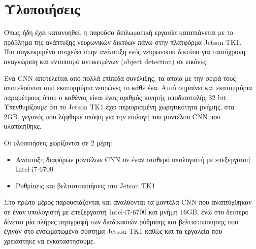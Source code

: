 \chapter{Υλοποιήσεις}
\label{chapter:implementations}

Όπως ήδη έχει κατανοηθεί, η παρούσα διπλωματική εργασία καταπιάνεται με το
πρόβλημα της ανάπτυξης νευρωνικών δικτύων πάνω στην πλατφόρμα Jetson TK1.
Πιο συγκεκριμένα στοχεύει στην ανάπτυξη ενός νευρωνικού δικτύου για ταυτόχρονη
αναγνώριση και εντοπισμό αντικειμένων (object detection) σε εικόνες.

Ένα CNN αποτελείται από πολλά επίπεδα συνέλιξης, τα οποία με την σειρά τους
αποτελούνται από εκατομμύρια νευρώνες το κάθε ένα. Αυτό σημαίνει και εκατομμύρια
παραμέτρους όπου ο καθένας είναι ένας αριθμός κινητής υποδιαστολής 32 bit.
Υπενθυμίζουμε ότι το Jetson TK1 έχει περιορισμένη χωρητικότητα μνήμης, στα 2GB,
γεγονός που λήφθηκε υπόψη για την επιλογή του μοντέλου CNN που υλοποιήθηκε.

Οι υλοποιήσεις χωρίζονται σε 2 μέρη:
\begin{itemize}
  \item{Ανάπτυξη διαφόρων μοντέλων CNN σε έναν σταθερό υπολογιστή με επεξεργαστή Intel-i7-6700}
  \item{Ρυθμίσεις και βελτιστοποιήσεις στο Jetson TK1}
\end{itemize}

Στο πρώτο μέρος παρουσιάζονται και αναλύονται τα μοντέλα CNN που αναπτύχθηκαν
σε έναν υπολογιστή με επεξεργαστή Intel-i7-6700 και μνήμη 16GB, ενώ στο
δεύτερο δίνεται μία πλήρες περιγραφή των διαδικασιών ρύθμισης και βελτιστοποίησης που έγιναν
στο ενσωματωμένο σύστημα Jetson TK1 καθώς και τα εργαλεία που χρειάστηκε να εγκαταστήσουμε.





